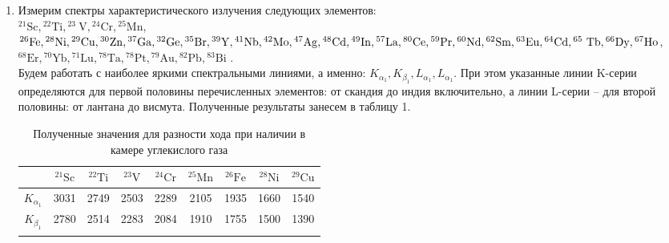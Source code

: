 \documentclass[a4paper, 12pt]{article}%
\begin{document}
	\begin{enumerate}
		
		\item Измерим спектры характеристического излучения следующих элементов: \\
		 ${ }^{21} \mathrm{Sc},{ }^{22} \mathrm{Ti},{ }^{23} \mathrm{~V},{ }^{24} \mathrm{Cr},{ }^{25} \mathrm{Mn}$, ${ }^{26} \mathrm{Fe},{ }^{28} \mathrm{Ni},{ }^{29} \mathrm{Cu}, { }^{30} \mathrm{Zn},{ }^{37} \mathrm{Ga},{ }^{32} \mathrm{Ge},{ }^{35} \mathrm{Br},{ }^{39} \mathrm{Y},{ }^{41} \mathrm{Nb},{ }^{42} \mathrm{Mo}, \\{ }^{47} \mathrm{Ag},{ }^{48} \mathrm{Cd},{ }^{49} \mathrm{In},{ }^{57} \mathrm{La},{ }^{80} \mathrm{Ce},{ }^{59} \mathrm{Pr},{ }^{60} \mathrm{Nd},{ }^{62} \mathrm{Sm},{ }^{63} \mathrm{Eu},{ }^{64} \mathrm{Cd},{ }^{65} \mathrm{~Tb},{ }^{66} \mathrm{Dy},\\{ }^{67} \mathrm{Ho}$, ${ }^{68} \mathrm{Er},{ }^{70} \mathrm{Yb},{ }^{71} \mathrm{Lu},{ }^{78} \mathrm{Ta},{ }^{78} \mathrm{Pt},{ }^{79} \mathrm{Au},{ }^{82} \mathrm{Pb},{ }^{83} \mathrm{Bi}$ .\\
		 Будем работать с наиболее яркими спектральными линиями,
		 а именно: $K_{\alpha_1}, K_{\beta_1}, L_{\alpha_1}, L_{\alpha_1}$. При этом указанные линии K-серии определяются для первой половины перечисленных элементов: от скандия до индия включительно, а линии L-серии – для второй
		 половины: от лантана до висмута.
		 Полученные результаты занесем в таблицу 1.
		 
		 
		 	\begin{longtable}{|c|c|c|c|c|c|c|c|c|}
		 	\hline
  			& ${ }^{21} \mathrm{Sc}$ & ${ }^{22} \mathrm{Ti}$ & ${}^{23} \mathrm{V}$ & ${ }^{24} \mathrm{Cr}$ & ${ }^{25} \mathrm{Mn}$ & ${ }^{26} \mathrm{Fe}$ & ${ }^{28} \mathrm{Ni}$ & ${ }^{29} \mathrm{Cu}$ \\ \hline
		 	
		 	$K_{\alpha_1}$ & 3031 & 2749 & 2503 & 2289 & 2105 & 1935 & 1660 & 1540\\ \hline
		 	$K_{\beta_1}$ & 2780 & 2514 & 2283 & 2084 & 1910 & 1755 & 1500 & 1390\\ \hline
		 	\caption{Полученные значения для разности хода при наличии в камере углекислого газа}
		 \end{longtable}
		 
		 
		
		
		
		
		
		
		
		
		
		
		
		
		
		
		
		
		
		
		
		
		
		
		
		
		
		
		
		
		
		
		
		
		
	\end{enumerate}
	
	
	
	
	
	
	
	
	
	
	
	
	
	
	
\end{document}
